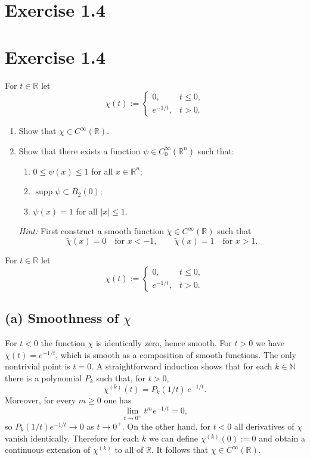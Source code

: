 \documentclass[12pt,a4paper]{article}
\theoremstyle{plain}
\theoremstyle{definition}
\theoremstyle{remark}
\theoremstyle{remark}
\begin{document}
\section*{Exercise 1.4}

\section*{Exercise 1.4}

For $t\in\mathbb{R}$ let
\[
\chi(t) :=
\begin{cases}
	0, & t \le 0,\\[0.3em]
	e^{-1/t}, & t > 0.
\end{cases}
\]

\begin{enumerate}
	\item[(a)] Show that $\chi \in C^\infty(\mathbb{R})$.
	
	\item[(b)] Show that there exists a function
	$\psi \in C_0^\infty(\mathbb{R}^n)$ such that:
	\begin{enumerate}
		\item[(i)] $0 \le \psi(x) \le 1$ for all $x\in\mathbb{R}^n$;
		\item[(ii)] $\operatorname{supp}\psi \subset B_2(0)$;
		\item[(iii)] $\psi(x)=1$ for all $|x|\le 1$.
	\end{enumerate}
	
	\medskip
	
	\noindent\textit{Hint:} First construct a smooth function
	$\tilde\chi\in C^\infty(\mathbb{R})$ such that
	\[
	\tilde\chi(x)=0 \quad \text{for } x<-1,
	\qquad
	\tilde\chi(x)=1 \quad \text{for } x>1.
	\]
\end{enumerate}


For $t\in\mathbb{R}$ let
\[
\chi(t) :=
\begin{cases}
	0, & t\le 0,\\[0.3em]
	e^{-1/t}, & t>0.
\end{cases}
\]

\subsection*{(a) Smoothness of $\chi$}

For $t<0$ the function $\chi$ is identically zero, hence smooth.  For
$t>0$ we have $\chi(t)=e^{-1/t}$, which is smooth as a composition of
smooth functions.  The only nontrivial point is $t=0$.
A straightforward induction shows that for each $k\in\mathbb{N}$ there is
a polynomial $P_k$ such that, for $t>0$,
\[
\chi^{(k)}(t) = P_k(1/t)\,e^{-1/t}.
\]
Moreover, for every $m\ge 0$ one has
\[
\lim_{t\to 0^+} t^m e^{-1/t} = 0,
\]
so $P_k(1/t)e^{-1/t}\to 0$ as $t\to 0^+$.  On the other hand, for $t<0$
all derivatives of $\chi$ vanish identically.  Therefore for each $k$ we
can define $\chi^{(k)}(0):=0$ and obtain a continuous extension of
$\chi^{(k)}$ to all of $\mathbb{R}$.  It follows that $\chi\in
C^\infty(\mathbb{R})$.
\end{document}
